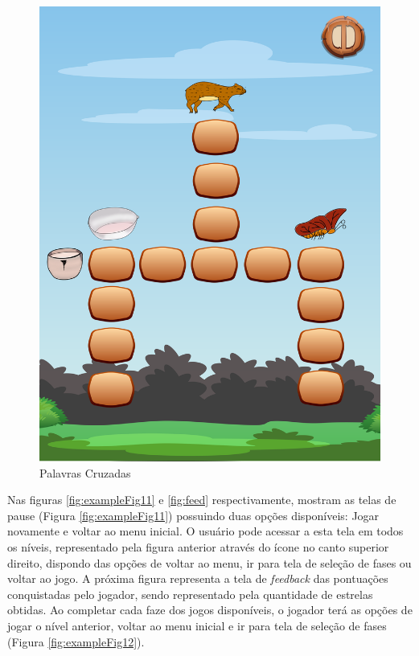 \documentclass[12pt]{article}
\begin{document}
\begin{figure}[!htb]
			\includegraphics[width=\linewidth]{img/palavraCruzadas.png}
			\caption{Palavras Cruzadas}\label{fig:exampleFig8}
			\endminipage
		\end{figure}
	
		Nas figuras \ref{fig:exampleFig11} e \ref{fig:feed} respectivamente, mostram as telas de pause (Figura \ref{fig:exampleFig11}) possuindo duas opções disponíveis: Jogar novamente e voltar ao menu inicial. O usuário pode acessar a esta tela em todos os níveis, representado pela figura anterior através do ícone no canto superior direito, dispondo das opções de voltar ao menu, ir para tela de seleção de fases ou voltar ao jogo. A próxima figura representa a tela de \textit{feedback} das pontuações conquistadas pelo jogador, sendo representado pela quantidade de estrelas obtidas. Ao completar cada faze dos jogos disponíveis, o jogador terá as opções de jogar o nível anterior, voltar ao menu inicial e ir para tela de seleção de fases (Figura \ref{fig:exampleFig12}).
		
\end{document}
